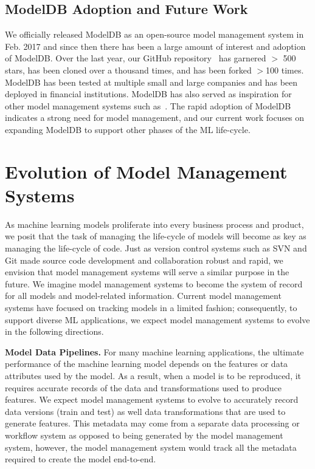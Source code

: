 \documentclass[11pt]{article}
\newcommand{\mdb}{{\sc ModelDB}\xspace}
\begin{document}

\subsection{\mdb Adoption and Future Work}

We officially released \mdb as an open-source model management system in 
Feb. 2017 and since then there has been a large amount of interest and adoption of \mdb.
Over the last year, our GitHub repository~\cite{mdb-repo} 
has garnered $>$ 500 stars, has been cloned over a thousand times, and has been
forked $>$100 times.
\mdb has been tested at multiple small and large companies and has been deployed in financial institutions.
\mdb has also served as inspiration for other model management systems such as~\cite{mlflow}.
The rapid adoption of \mdb indicates a strong need for model management, and our current work focuses on expanding \mdb to support other phases of the ML life-cycle.
\section{Evolution of Model Management Systems}
\label{sec:future}

As machine learning models proliferate into every business process and product, we posit that the task of managing the life-cycle of models will become as key as managing the life-cycle of code.
Just as version control systems such as SVN and Git made source code development and collaboration robust and rapid, we envision that model management systems will serve a similar purpose in the future.
We imagine model management systems to become the system of record for all models and model-related information.
Current model management systems have focused on tracking models in a limited fashion; consequently, to support diverse ML applications, we expect model management systems to evolve in the following directions.

{\bf Model Data Pipelines.} For many machine learning applications, the ultimate performance of the machine learning model depends on the features or data attributes used by the model.
As a result, when a model is to be reproduced, it requires accurate records of the data and transformations used to produce features.
We expect model management systems to evolve to accurately record data versions (train and test) as well data transformations that are used to generate features.
This metadata may come from a separate data processing or workflow system as opposed to being generated by the model management system, however, the model management system would track all the metadata required to create the model end-to-end.
\end{document}
